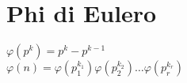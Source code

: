 \section{Phi di Eulero}
$\varphi (p^k) = p^k-p^{k-1}$ \\
$\varphi (n)=\varphi (p_{1}^{k_{1}})\varphi (p_{2}^{k_{2}})\ldots \varphi (p_{r}^{k_{r}})$